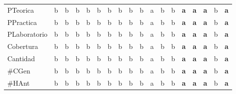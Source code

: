 {\begin{longtable}{lccccccccccccccccc}
PTeorica & \color{grisclaro}b & \color{grisclaro}b & \color{grisclaro}b & \color{grisclaro}b & \color{grisclaro}b & \color{grisclaro}b & \color{grisclaro}b & \color{grisclaro}b & \color{grisclaro}b & a & \color{grisclaro}b & \color{grisclaro}b & \textbf{\color{azuldos}a} & \textbf{\color{azuldos}a} & \textbf{\color{azuldos}a} & \color{grisclaro}b & \textbf{\color{azuldos}a} \\
PPractica & \color{grisclaro}b & \color{grisclaro}b & \color{grisclaro}b & \color{grisclaro}b & \color{grisclaro}b & \color{grisclaro}b & \color{grisclaro}b & \color{grisclaro}b & \color{grisclaro}b & a & \color{grisclaro}b & \color{grisclaro}b & \textbf{\color{azuldos}a} & \textbf{\color{azuldos}a} & \textbf{\color{azuldos}a} & \color{grisclaro}b & \textbf{\color{azuldos}a} \\
PLaboratorio & \color{grisclaro}b & \color{grisclaro}b & \color{grisclaro}b & \color{grisclaro}b & \color{grisclaro}b & \color{grisclaro}b & \color{grisclaro}b & \color{grisclaro}b & \color{grisclaro}b & a & \color{grisclaro}b & \color{grisclaro}b & \textbf{\color{azuldos}a} & \textbf{\color{azuldos}a} & \textbf{\color{azuldos}a} & \color{grisclaro}b & \textbf{\color{azuldos}a} \\
Cobertura & \color{grisclaro}b & \color{grisclaro}b & \color{grisclaro}b & \color{grisclaro}b & \color{grisclaro}b & \color{grisclaro}b & \color{grisclaro}b & \color{grisclaro}b & \color{grisclaro}b & a & \color{grisclaro}b & \color{grisclaro}b & \textbf{\color{azuldos}a} & \textbf{\color{azuldos}a} & \textbf{\color{azuldos}a} & \color{grisclaro}b & \textbf{\color{azuldos}a} \\
Cantidad & \color{grisclaro}b & \color{grisclaro}b & \color{grisclaro}b & \color{grisclaro}b & \color{grisclaro}b & \color{grisclaro}b & \color{grisclaro}b & \color{grisclaro}b & \color{grisclaro}b & a & \color{grisclaro}b & \color{grisclaro}b & \textbf{\color{azuldos}a} & \textbf{\color{azuldos}a} & \textbf{\color{azuldos}a} & \color{grisclaro}b & \textbf{\color{azuldos}a} \\
\#CGen & \color{grisclaro}b & \color{grisclaro}b & \color{grisclaro}b & \color{grisclaro}b & \color{grisclaro}b & \color{grisclaro}b & \color{grisclaro}b & \color{grisclaro}b & \color{grisclaro}b & a & \color{grisclaro}b & \color{grisclaro}b & \textbf{\color{azuldos}a} & \textbf{\color{azuldos}a} & \textbf{\color{azuldos}a} & \color{grisclaro}b & \textbf{\color{azuldos}a} \\
\#HAnt & \color{grisclaro}b & \color{grisclaro}b & \color{grisclaro}b & \color{grisclaro}b & \color{grisclaro}b & \color{grisclaro}b & \color{grisclaro}b & \color{grisclaro}b & \color{grisclaro}b & a & \color{grisclaro}b & \color{grisclaro}b & \textbf{\color{azuldos}a} & \textbf{\color{azuldos}a} & \textbf{\color{azuldos}a} & \color{grisclaro}b & \textbf{\color{azuldos}a} \\

\end{longtable}}
